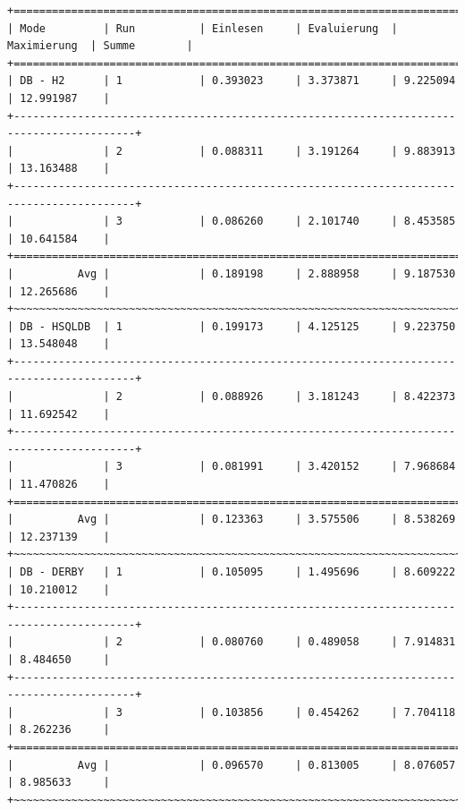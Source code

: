 \documentclass[draft,final]{vutinfth} %
\begin{document}
\begin{lstlisting}[float,basicstyle=\tiny,caption={Benchmark DB \textbf{ohne} Indizes, Datei: lubm-ex-20-15.sparql.xml},label={lst:dboi15}]
+=========================================================================================+
| Mode         | Run          | Einlesen     | Evaluierung  | Maximierung  | Summe        | 
+=========================================================================================+
| DB - H2      | 1            | 0.393023     | 3.373871     | 9.225094     | 12.991987    | 
+-----------------------------------------------------------------------------------------+
|              | 2            | 0.088311     | 3.191264     | 9.883913     | 13.163488    | 
+-----------------------------------------------------------------------------------------+
|              | 3            | 0.086260     | 2.101740     | 8.453585     | 10.641584    | 
+=========================================================================================+
|          Avg |              | 0.189198     | 2.888958     | 9.187530     | 12.265686    | 
+~~~~~~~~~~~~~~~~~~~~~~~~~~~~~~~~~~~~~~~~~~~~~~~~~~~~~~~~~~~~~~~~~~~~~~~~~~~~~~~~~~~~~~~~~+
| DB - HSQLDB  | 1            | 0.199173     | 4.125125     | 9.223750     | 13.548048    | 
+-----------------------------------------------------------------------------------------+
|              | 2            | 0.088926     | 3.181243     | 8.422373     | 11.692542    | 
+-----------------------------------------------------------------------------------------+
|              | 3            | 0.081991     | 3.420152     | 7.968684     | 11.470826    | 
+=========================================================================================+
|          Avg |              | 0.123363     | 3.575506     | 8.538269     | 12.237139    | 
+~~~~~~~~~~~~~~~~~~~~~~~~~~~~~~~~~~~~~~~~~~~~~~~~~~~~~~~~~~~~~~~~~~~~~~~~~~~~~~~~~~~~~~~~~+
| DB - DERBY   | 1            | 0.105095     | 1.495696     | 8.609222     | 10.210012    | 
+-----------------------------------------------------------------------------------------+
|              | 2            | 0.080760     | 0.489058     | 7.914831     | 8.484650     | 
+-----------------------------------------------------------------------------------------+
|              | 3            | 0.103856     | 0.454262     | 7.704118     | 8.262236     | 
+=========================================================================================+
|          Avg |              | 0.096570     | 0.813005     | 8.076057     | 8.985633     | 
+~~~~~~~~~~~~~~~~~~~~~~~~~~~~~~~~~~~~~~~~~~~~~~~~~~~~~~~~~~~~~~~~~~~~~~~~~~~~~~~~~~~~~~~~~+

\end{lstlisting}
\end{document}

